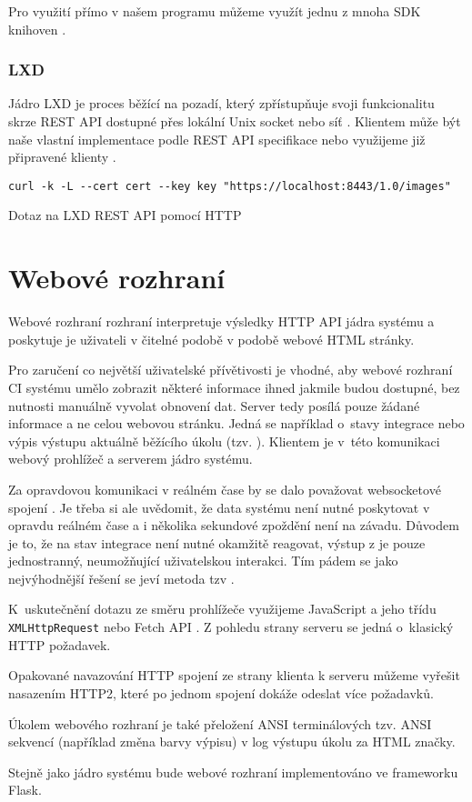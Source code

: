Pro využití přímo v našem programu můžeme využít jednu z mnoha SDK knihoven \cite{docker_sdk}.

\subsubsection{LXD}

Jádro LXD je proces běžící na pozadí, který zpřístupňuje svoji funkcionalitu skrze REST API dostupné přes lokální Unix socket nebo síť \cite{lxd}.
Klientem může být naše vlastní implementace podle REST API specifikace nebo využijeme již připravené klienty \cite{lxd_rest}.

\begin{listing}[ht]
\begin{verbatim}
curl -k -L --cert cert --key key "https://localhost:8443/1.0/images"
\end{verbatim}
\caption{Dotaz na LXD REST API pomocí HTTP}
\end{listing}

\section{Webové rozhraní}

Webové rozhraní rozhraní interpretuje výsledky HTTP API jádra systému a poskytuje je uživateli v čitelné podobě v podobě webové HTML stránky.

Pro zaručení co největší uživatelské přívětivosti je vhodné, aby webové rozhraní CI systému umělo zobrazit některé informace ihned jakmile budou dostupné, bez nutnosti manuálně vyvolat obnovení dat.
Server tedy posílá pouze žádané informace a ne celou webovou stránku.
Jedná se například o~stavy integrace nebo výpis výstupu aktuálně běžícího úkolu (tzv. ).
Klientem je v~této komunikaci webový prohlížeč a serverem jádro systému.

Za opravdovou komunikaci v reálném čase by se dalo považovat websocketové spojení \cite{websocket}.
Je třeba si ale uvědomit, že data systému není nutné poskytovat v opravdu reálném čase a i několika sekundové zpoždění není na závadu.
Důvodem je to, že na stav integrace není nutné okamžitě reagovat, výstup z  je pouze jednostranný, neumožňující uživatelskou interakci.
Tím pádem se jako nejvýhodnější řešení se jeví metoda tzv .

K~uskutečnění dotazu ze směru prohlížeče využijeme JavaScript a jeho třídu \verb|XMLHttpRequest| nebo Fetch API \cite{fetch_api}.
Z pohledu strany serveru se jedná o~klasický HTTP požadavek.

Opakované navazování HTTP spojení ze strany klienta k serveru můžeme vyřešit nasazením HTTP2, které po jednom spojení dokáže odeslat více požadavků.

Úkolem webového rozhraní je také přeložení ANSI terminálových tzv. ANSI  sekvencí (například změna barvy výpisu) v log výstupu úkolu za HTML značky.

Stejně jako jádro systému bude webové rozhraní implementováno ve frameworku Flask.




